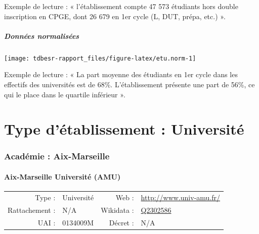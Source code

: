 \documentclass[12pt,french,landscape]{article}
\begin{document}
\begin{multicols}{2}
Exemple de lecture : « l'établissement compte 47 573 étudiants hors
double inscription en CPGE, dont 26 679 en 1er cycle (L, DUT, prépa,
etc.) ».

\hypertarget{donnuxe9es-normalisuxe9es}{%
\subsubsection{Données normalisées}\label{donnuxe9es-normalisuxe9es}}

\begin{center}\texttt{[image: tdbesr-rapport\_files/figure-latex/etu.norm-1]} \end{center}

Exemple de lecture : « La part moyenne des étudiants en 1er cycle dans
les effectifs des universités est de 68\%. L'établissement présente une
part de 56\%, ce qui le place dans le quartile inférieur ».

\end{multicols}

\newpage
\scriptsize

\newpage   
\vspace*{5cm}   
\part{Type d'établissement :  Université }   
\newpage

\hypertarget{acaduxe9mie-aix-marseille}{%
\section{Académie : Aix-Marseille}\label{acaduxe9mie-aix-marseille}}

\hypertarget{aix-marseille-universituxe9-amu}{%
\subsection{Aix-Marseille Université
(AMU)}\label{aix-marseille-universituxe9-amu}}

\begin{tabular*}{0.45\textwidth}{rp{2cm}rl}  
\hline  
Type : & Université & Web : &\href{http://www.univ-amu.fr/}{http://www.univ-amu.fr/} \\  
Rattachement : & N/A & Wikidata : & \href{https://www.wikidata.org/entity/Q2302586}{Q2302586} \\  
UAI : & 0134009M & Décret : & N/A \\  
\hline  
\end{tabular*}
\end{document}
